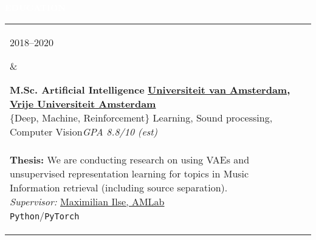 \documentclass{article}
\newcommand{\cvsect}[1]{
	\vspace{0.5\baselineskip}
	\colorbox{primary}{\textcolor{white}{\MakeUppercase{\textbf{#1}}}}\\
}
\newenvironment{entrylist}{
	\begin{longtable}[H]{l l}
}{
	\end{longtable}
}
\newcommand{\entry}[4]{%
	\parbox[t]{0.175\linewidth}{#1} &
	\parbox[t]{0.825\linewidth}{
		\textbf{#2}%
		\hfill%
		{\footnotesize \textbf{\textcolor{black}{#3}}}\\%
		{\small #4} %
    }\\\\}
\newcommand{\slashsep}{\hspace{2mm}/\hspace{2mm}}
\begin{document}
\cvsect{Education}
\begin{entrylist}
    \entry{2018--2020}
    {M.Sc. Artificial Intelligence}
    {\href{https://uva.nl}{Universiteit van Amsterdam}, \href{https://vu.nl}{Vrije Universiteit Amsterdam}}
    {
        \{Deep, Machine, Reinforcement\} Learning, Sound processing, Computer Vision\hfill\textit{GPA 8.8/10 \scriptsize{(est)}}\\
        \\
        \textbf{Thesis:} We are conducting research on using VAEs and unsupervised representation learning for topics in Music Information retrieval (including source separation).\\
        \emph{Supervisor:} \href{https://scholar.google.com/citations?user=KNJIRGkAAAAJ}{Maximilian Ilse, AMLab}\\
        \texttt{Python}\slashsep\texttt{PyTorch}
    }

    \entry{2014--2017}
    {B.Sc. Applied Computer Science}
    {\href{https://www.uni-heidelberg.de/en}{University Heidelberg}}
    {
        \textit{Focus}: Image processing and pattern recognition\hfill\textit{GPA 3.48/4}\\
        \\
        \textbf{\href{https://github.com/morris-frank/ba_latex/blob/master/thesis.pdf}{Thesis:}} Using a FCN-ResNet based detector the thesis provides a reverse image search tool here in particular to retrieve art historic images containing an object given by a reference image.\\
        \emph{Supervisor:} \href{https://scholar.google.com/citations?user=ZrRs-qoAAAAJ}{Dr.\ Miguel Bautista Martin}, \href{https://hci.iwr.uni-heidelberg.de/Staff/bommer}{Prof.\ Dr.\ Björn Ommer}\\
        \texttt{Python}\slashsep\texttt{Caffe}\slashsep\texttt{Keras}\\
    }

    \entry{2013--2014}
    {B.Sc. Physics}
    {\href{https://www.uni-heidelberg.de/en}{University Heidelberg}}
    {Change of degree after the second semester, kept as minor studies}

\end{entrylist}
\end{document}
